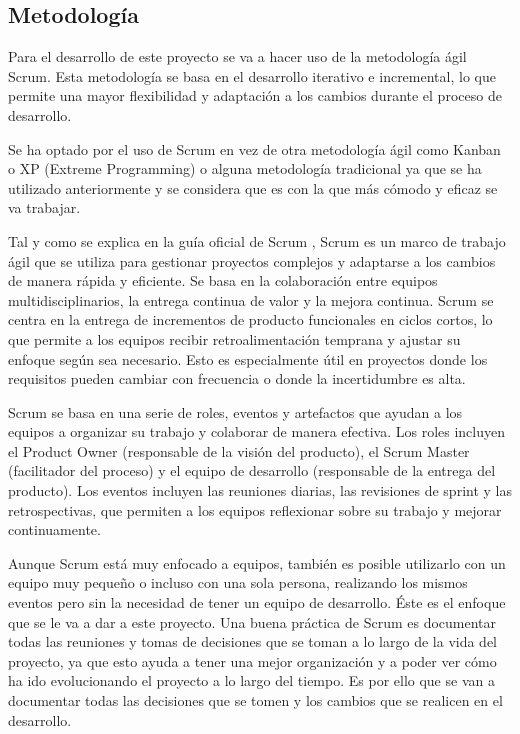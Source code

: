 \subsection{Metodología}
\label{sec:metodologia}

Para el desarrollo de este proyecto se va a hacer uso de la metodología ágil Scrum. Esta metodología se basa en el desarrollo iterativo e incremental, lo que permite una mayor flexibilidad y adaptación a los cambios durante el proceso de desarrollo.

Se ha optado por el uso de Scrum en vez de otra metodología ágil como Kanban o XP (Extreme Programming) o alguna metodología tradicional ya que se ha utilizado anteriormente y se considera que es con la que más cómodo y eficaz se va trabajar.

Tal y como se explica en la guía oficial de Scrum \parencite{scrum-guide}, Scrum es un marco de trabajo ágil que se utiliza para gestionar proyectos complejos y adaptarse a los cambios de manera rápida y eficiente. Se basa en la colaboración entre equipos multidisciplinarios, la entrega continua de valor y la mejora continua.
Scrum se centra en la entrega de incrementos de producto funcionales en ciclos cortos, lo que permite a los equipos recibir retroalimentación temprana y ajustar su enfoque según sea necesario. Esto es especialmente útil en proyectos donde los requisitos pueden cambiar con frecuencia o donde la incertidumbre es alta.

Scrum se basa en una serie de roles, eventos y artefactos que ayudan a los equipos a organizar su trabajo y colaborar de manera efectiva. Los roles incluyen el Product Owner (responsable de la visión del producto), el Scrum Master (facilitador del proceso) y el equipo de desarrollo (responsable de la entrega del producto). Los eventos incluyen las reuniones diarias, las revisiones de sprint y las retrospectivas, que permiten a los equipos reflexionar sobre su trabajo y mejorar continuamente.

Aunque Scrum está muy enfocado a equipos, también es posible utilizarlo con un equipo muy pequeño o incluso con una sola persona, realizando los mismos eventos pero sin la necesidad de tener un equipo de desarrollo.
Éste es el enfoque que se le va a dar a este proyecto. Una buena práctica de Scrum es documentar todas las reuniones y tomas de decisiones que se toman a lo largo de la vida del proyecto, ya que esto ayuda a tener una mejor organización y a poder ver cómo ha ido evolucionando el proyecto a lo largo del tiempo.
Es por ello que se van a documentar todas las decisiones que se tomen y los cambios que se realicen en el desarrollo.


